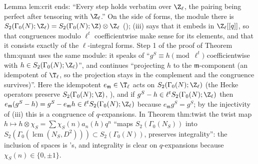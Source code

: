 \begin{paperlink}\label{pl:modforms:crit}
Lemma lem:crit ends: ``Every step holds verbatim over $\Z_\ell$, the pairing being perfect after tensoring with $\Z_\ell$.'' On the side of forms, the module there is
$S_2(\Gamma_0(N);\Z_\ell)=S_2(\Gamma_0(N);\Z)\otimes\Z_\ell$ (); (iii) says that it embeds in $\Z_\ell[[q]]$, so that congruences modulo $\ell^t$
coefficientwise make sense for its elements, and that it consists exactly of the $\ell$-integral forms. Step 1 of the proof of Theorem thm:quant uses the same module: it speaks of
``$g^S\equiv h\pmod{\ell^t}$ coefficientwise with $h\in S_2(\Gamma_0(N);\Z_\ell)$'', and continues ``projecting
$h$ to the $\mathfrak m$-component (an idempotent of $\T_\ell$, so the projection stays in the complement and the congruence survives)''. Here the idempotent $e_{\mathfrak m}\in\T_\ell$
acts on $S_2(\Gamma_0(N);\Z_\ell)$ (the Hecke operators preserve $S_2(\Gamma_0(N);\Z)$, ), and if $g^S-h\in\ell^tS_2(\Gamma_0(N);\Z_\ell)$ then $e_{\mathfrak m}(g^S-h)=g^S-e_{\mathfrak m}h\in\ell^tS_2(\Gamma_0(N);\Z_\ell)$ because $e_{\mathfrak m}g^S=g^S$; by
the injectivity of (iii) this is a congruence of $q$-expansions. In Theorem thm:twist the twist map $h\mapsto h\otimes\chi_S=\sum\chi_S(n)a_n(h)q^n$ ``maps $S_2(\Gamma_0(N_S))$ into
$S_2(\Gamma_0(\operatorname{lcm}(N_S,D^2)))\subset S_2(\Gamma_0(N))$, preserves integrality'': the inclusion of spaces is 's, and integrality is clear on $q$-expansions because $\chi_S(n)\in\{0,\pm1\}$.
\end{paperlink}


